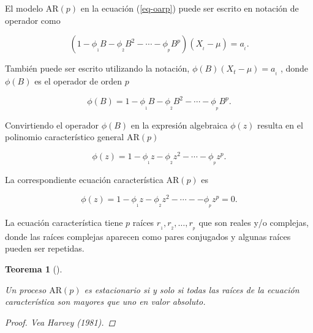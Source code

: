 \documentclass[
  us-letterpaper,
]{scrreprt}
\theoremstyle{plain}
\newtheorem{theorem}{Teorema}[chapter]
\theoremstyle{definition}
\theoremstyle{definition}
\theoremstyle{plain}
\theoremstyle{remark}
\begin{document}
El modelo \(\mathrm{AR}(p)\) en la ecuación (\ref{eq-oarp}) puede ser
escrito en notación de operador como

\[
(1-\phi_{_1}B-\phi_{_2}B^2-\cdots-\phi_{_p}B^p)(X_{_t}-\mu)=a_{_t}.
\]

También puede ser escrito utilizando la notación,
\(\phi(B)(X_{t}-\mu)=a_{_t}\) , donde \(\phi(B)\) es el operador de
orden \(p\)

\[
\phi(B)=1-\phi_{_1}B-\phi_{_2}B^2-\cdots-\phi_{_p}B^p.
\]

Convirtiendo el operador \(\phi(B)\) en la expresión algebraica
\(\phi(z)\) resulta en el polinomio característico general
\(\mathrm{AR}(p)\)

\[
\phi(z)=1-\phi_{_1}z-\phi_{_2}z^2-\cdots-\phi_{_p}z^p.
\]

La correspondiente ecuación característica \(\mathrm{AR}(p)\) es

\[\phi(z) = 1 -\phi_{_1}z -\phi_{_2}z^2 - \cdots - -\phi_{_p}z^p = 0.\]

La ecuación característica tiene \(p\) raíces
\(r_{_1}, r_{_2} ,\ldots, r_{_p}\) que son reales y/o complejas, donde
las raíces complejas aparecen como pares conjugados y algunas raíces
pueden ser repetidas.

\begin{theorem}[]\protect\hypertarget{thm-arpest}{}\label{thm-arpest}

Un proceso \(\mathrm{AR}(p)\) es estacionario si y solo si todas las
raíces de la ecuación característica son mayores que uno en valor
absoluto.

\begin{proof}
Vea Harvey (1981).
\end{proof}

\end{theorem}
\end{document}
